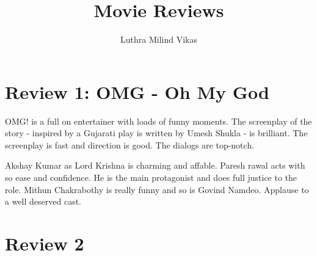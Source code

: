\documentclass{article}
\author{Luthra Milind Vikas}
\date{}
\title{Movie Reviews}
\begin{document}
\maketitle

\section{Review 1: OMG - Oh My God}

OMG! is a full on entertainer with loads of funny moments. The screenplay of the story - inspired by a Gujarati play is written by Umesh Shukla - is brilliant. The screenplay is fast and direction is good. The dialogs are top-notch.

Akshay Kumar as Lord Krishna is charming and affable. Paresh rawal acts with so ease and confidence. He is the main protagonist and does full justice to the role. Mithun Chakrabothy is really funny and so is Govind Namdeo. Applause to a well deserved cast.


\section{Review 2}
\end{document}
